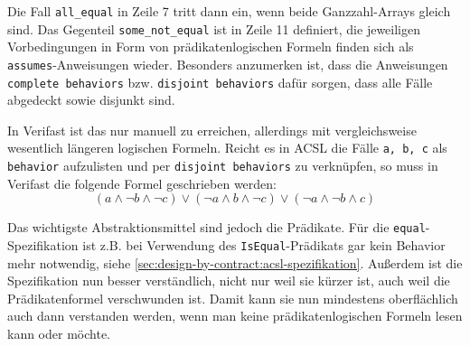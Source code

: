 

Die Fall \lstinline{all_equal} in Zeile 7 tritt dann ein, wenn beide Ganzzahl-Arrays gleich sind. Das Gegenteil
\lstinline{some_not_equal} ist in Zeile 11 definiert, die jeweiligen Vorbedingungen in Form von
prädikatenlogischen Formeln finden sich als \lstinline{assumes}-Anweisungen wieder. Besonders anzumerken ist,
dass die Anweisungen \lstinline{complete behaviors} bzw. \lstinline{disjoint behaviors} dafür sorgen, dass
alle Fälle abgedeckt sowie disjunkt sind.

In Verifast ist das nur manuell zu erreichen, allerdings mit vergleichsweise wesentlich längeren logischen Formeln.
Reicht es in ACSL die Fälle \lstinline{a, b, c} als \lstinline{behavior} aufzulisten und per \lstinline{disjoint behaviors}
zu verknüpfen, so muss in Verifast die folgende Formel geschrieben werden:
\[(a \land \neg b \land \neg c) \lor (\neg a \land b \land \neg c) \lor (\neg a \land \neg b \land c)\]

Das wichtigste Abstraktionsmittel sind jedoch die Prädikate. Für die \lstinline{equal}-Spezifikation ist 
z.B. bei Verwendung des \lstinline{IsEqual}-Prädikats gar kein Behavior mehr notwendig,
siehe \ref{sec:design-by-contract:acsl-spezifikation}. Außerdem ist die Spezifikation nun besser verständlich,
nicht nur weil sie kürzer ist, auch weil die Prädikatenformel verschwunden ist. Damit kann sie nun mindestens
oberflächlich auch dann verstanden werden, wenn man keine prädikatenlogischen Formeln lesen kann oder möchte.
